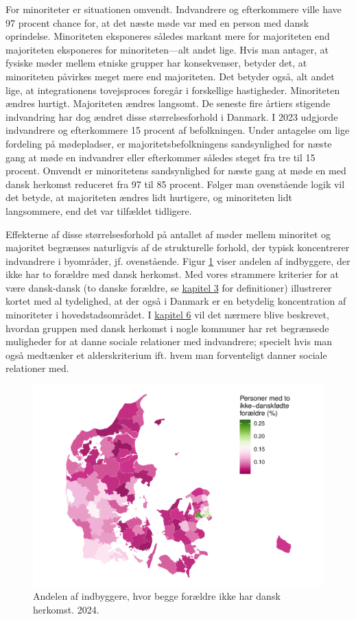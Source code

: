\documentclass[
]{book}
\begin{document}
For minoriteter er situationen omvendt. Indvandrere og efterkommere ville have 97 procent chance for, at det næste møde var med en person med dansk oprindelse. Minoriteten eksponeres således markant mere for majoriteten end majoriteten eksponeres for minoriteten---alt andet lige. Hvis man antager, at fysiske møder mellem etniske grupper har konsekvenser, betyder det, at minoriteten påvirkes meget mere end majoriteten. Det betyder også, alt andet lige, at integrationens tovejsproces foregår i forskellige hastigheder. Minoriteten ændres hurtigt. Majoriteten ændres langsomt. De seneste fire årtiers stigende indvandring har dog ændret disse størrelsesforhold i Danmark. I 2023 udgjorde indvandrere og efterkommere 15 procent af befolkningen. Under antagelse om lige fordeling på mødepladser, er majoritetsbefolkningens sandsynlighed for næste gang at møde en indvandrer eller efterkommer således steget fra tre til 15 procent. Omvendt er minoritetens sandsynlighed for næste gang at møde en med dansk herkomst reduceret fra 97 til 85 procent. Følger man ovenstående logik vil det betyde, at majoriteten ændres lidt hurtigere, og minoriteten lidt langsommere, end det var tilfældet tidligere.

Effekterne af disse størrelsesforhold på antallet af møder mellem minoritet og majoritet begrænses naturligvis af de strukturelle forhold, der typisk koncentrerer indvandrere i byområder, jf. ovenstående. Figur \ref{fig:fig-1-22} viser andelen af indbyggere, der ikke har to forældre med dansk herkomst. Med vores strammere kriterier for at være dansk-dansk (to danske forældre, se \hyperref[kap3]{kapitel 3} for definitioner) illustrerer kortet med al tydelighed, at der også i Danmark er en betydelig koncentration af minoriteter i hovedstadsområdet. I \hyperref[kap6]{kapitel 6} vil det nærmere blive beskrevet, hvordan gruppen med dansk herkomst i nogle kommuner har ret begrænsede muligheder for at danne sociale relationer med indvandrere; specielt hvis man også medtænker et alderskriterium ift. hvem man forventeligt danner sociale relationer med.

\newpage

\begin{figure}
\includegraphics[width=1\linewidth]{en-befolkning-blander-sig_files/figure-latex/fig-1-22-1} \caption{Andelen af indbyggere, hvor begge forældre ikke har dansk herkomst. 2024.}\label{fig:fig-1-22}
\end{figure}
\end{document}
